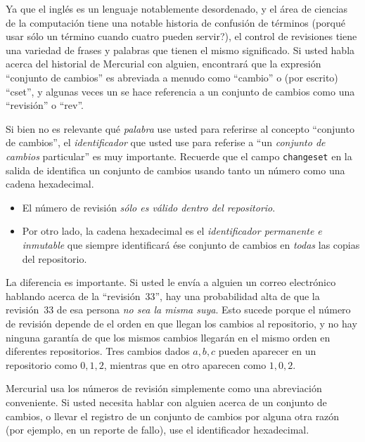 Ya que el inglés es un lenguaje notablemente desordenado, y el área de
ciencias de la computación tiene una notable historia de confusión de
términos (porqué usar sólo un término cuando cuatro pueden servir?),
el control de revisiones tiene una variedad de frases y palabras que
tienen el mismo significado. Si usted habla acerca del historial de
Mercurial con alguien, encontrará que la expresión ``conjunto de
cambios'' es abreviada a menudo como ``cambio'' o (por escrito)
``cset'',
y algunas veces un se hace referencia a un conjunto de cambios como
una ``revisión'' o ``rev''.

Si bien no es relevante qué \emph{palabra} use usted para referirse al
concepto ``conjunto de cambios'', el \emph{identificador} que usted
use para referise a ``un \emph{conjunto de cambios} particular'' es
muy importante. Recuerde que el campo \texttt{changeset} en la salida
de  identifica un conjunto de cambios usando tanto un
número como una cadena hexadecimal.

\begin{itemize}
    \item El número de revisión \emph{sólo es válido dentro del
        repositorio}.
    \item Por otro lado, la cadena hexadecimal es el
        \emph{identificador permanente e inmutable} que siempre
        identificará ése conjunto de cambios en \emph{todas} las
        copias del repositorio.
\end{itemize}
La diferencia es importante. Si usted le envía a alguien un correo
electrónico hablando acerca de la ``revisión~33'', hay una
probabilidad alta de que la revisión~33 de esa persona \emph{no sea la
misma suya}. Esto sucede porque el número de revisión depende de el
orden en que llegan los cambios al repositorio, y no hay ninguna
garantía de que los mismos cambios llegarán en el mismo orden en
diferentes repositorios. Tres cambios dados $a,b,c$ pueden aparecer en
un repositorio como $0,1,2$, mientras que en otro aparecen como
$1,0,2$.

Mercurial usa los números de revisión simplemente como una abreviación
conveniente. Si usted necesita hablar con alguien acerca de un
conjunto de cambios, o llevar el registro de un conjunto de cambios
por alguna otra razón (por ejemplo, en un reporte de fallo), use el
identificador hexadecimal.

